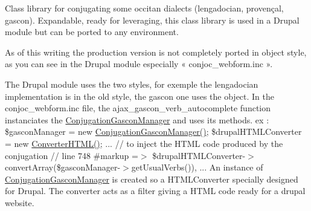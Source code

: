 Class library for conjugating some occitan dialects (lengadocian, provençal, gascon). Expandable, ready for leveraging, this class library is used in a Drupal module but can be ported to any environment.

As of this writing the production version is not completely ported in object style, as you can see in the Drupal module especially « conjoc\+\_\+webform.\+inc ».

The Drupal module uses the two styles, for exemple the lengadocian implementation is in the old style, the gascon one uses the object. In the conjoc\+\_\+webform.\+inc file, the ajax\+\_\+gascon\+\_\+verb\+\_\+autocomplete function instanciates the \hyperlink{classConjugationGasconManager}{Conjugation\+Gascon\+Manager} and uses its methods. ex \+: \$gascon\+Manager = new \hyperlink{classConjugationGasconManager}{Conjugation\+Gascon\+Manager()}; \$drupal\+H\+T\+M\+L\+Converter = new \hyperlink{classConverterHTML}{Converter\+H\+T\+M\+L()}; ... // to inject the H\+T\+ML code produced by the conjugation // line 748 \textquotesingle{}\#markup\textquotesingle{} =$>$ \$drupal\+H\+T\+M\+L\+Converter-\/$>$convert\+Array(\$gascon\+Manager-\/$>$get\+Usual\+Verbs()), ... An instance of \hyperlink{classConjugationGasconManager}{Conjugation\+Gascon\+Manager} is created so a H\+T\+M\+L\+Converter specially designed for Drupal. The converter acts as a filter giving a H\+T\+ML code ready for a drupal website. 
